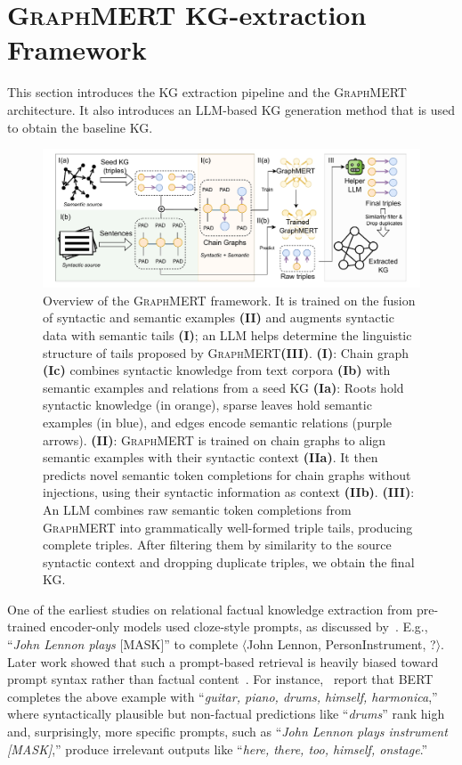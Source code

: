 \documentclass[10pt]{article}
\newcommand{\ours}{\textsc{GraphMERT}\xspace}
\begin{document}
\section{\ours KG-extraction Framework}
\label{sec:methodology}
This section introduces the KG extraction pipeline and the \ours architecture. It also introduces an LLM-based KG generation method that is used to obtain the baseline KG.

\begin{figure}[t]
\centering
\includegraphics[width=\linewidth]{pictures/methodology.pdf}
\caption{Overview of the \ours framework. It is trained on the fusion of syntactic and semantic examples \textbf{(II)} and augments syntactic data with semantic tails \textbf{(I)}; an LLM helps determine the linguistic structure of tails proposed by \ours \textbf{(III)}.
\textbf{(I)}: Chain graph \textbf{(Ic)} combines syntactic knowledge from text corpora \textbf{(Ib)} with semantic examples and relations from a seed KG \textbf{(Ia)}: Roots hold syntactic knowledge (in orange), sparse leaves hold semantic examples (in blue), and edges encode semantic relations (purple arrows).
\textbf{(II)}: \ours is trained on chain graphs to align semantic examples with their syntactic context \textbf{(IIa)}. It then predicts novel semantic token completions for chain graphs without injections, using their syntactic information as context \textbf{(IIb)}.
\textbf{(III)}: An LLM combines raw semantic token completions from \ours into grammatically well-formed triple tails, producing complete triples. After filtering them by similarity to the source syntactic context and dropping duplicate triples, we obtain the final KG.
}
\label{fig:methodology}
\end{figure}


One of the earliest studies on relational factual knowledge extraction from pre-trained encoder-only models used cloze-style prompts, as discussed by~\citet{petroni-etal-2019-language}. E.g., “\textit{John Lennon plays} [MASK]” to complete $\langle$John Lennon, PersonInstrument, ?$\rangle$. Later work showed that such a prompt-based retrieval is heavily biased toward prompt syntax rather than factual content~\cite{cao-2021-knowledgeable}. For instance,~\citet{Silva_entailment} report that BERT~\cite{devlin2019bert} completes the above example with “\textit{guitar, piano, drums, himself, harmonica},” where syntactically plausible but non-factual predictions like “\textit{drums}” rank high and, surprisingly, more specific prompts, such as “\textit{John Lennon plays instrument [MASK]},” produce irrelevant outputs like “\textit{here, there, too, himself, onstage}.”
\end{document}
